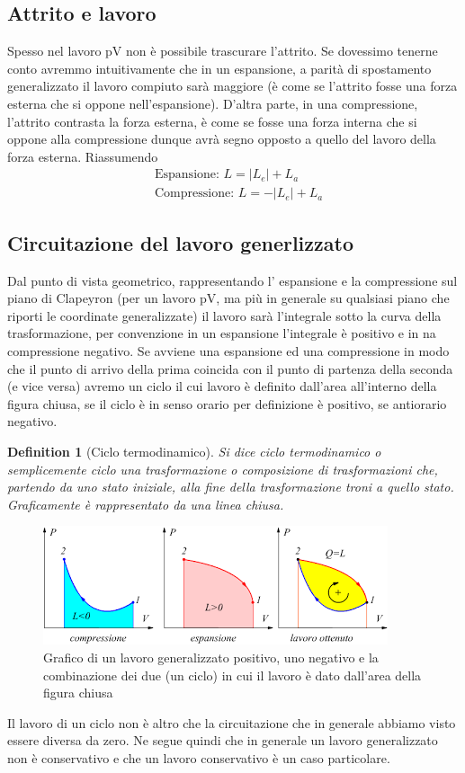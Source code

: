 \documentclass[10pt,a4paper]{article}
\newtheorem{definition}{Definition}
\begin{document}
\subsection{Attrito e lavoro}
Spesso nel lavoro pV non è possibile trascurare l'attrito. Se dovessimo tenerne conto avremmo intuitivamente che in un espansione, a parità di spostamento generalizzato il lavoro compiuto sarà maggiore (è come se l'attrito fosse una forza esterna che si oppone nell'espansione). D'altra parte, in una compressione, l'attrito contrasta la forza esterna, è come se fosse una forza interna che si oppone alla compressione dunque avrà segno opposto a quello del lavoro della forza esterna. Riassumendo
\begin{align*}
	&\text{Espansione: } L = |L_e| + L_a\\
	&\text{Compressione: } L = -|L_e| +L_a
\end{align*}
\subsection{Circuitazione del lavoro generlizzato}
Dal punto di vista geometrico, rappresentando l' espansione e la compressione sul piano di Clapeyron (per un lavoro pV, ma più in generale su qualsiasi piano che riporti le coordinate generalizzate) il lavoro sarà l'integrale sotto la curva della trasformazione, per convenzione in un espansione l'integrale è positivo e in na compressione negativo. Se avviene una espansione ed una compressione in modo che il punto di arrivo della prima coincida con il punto di partenza della seconda (e vice versa) avremo un ciclo il cui lavoro è definito dall'area all'interno della figura chiusa, se il ciclo è in senso orario per definizione è positivo, se antiorario negativo. 
\begin{definition}[Ciclo termodinamico]
	Si dice ciclo termodinamico o semplicemente ciclo una trasformazione o composizione di trasformazioni che, partendo da uno stato iniziale, alla fine della trasformazione troni a quello stato. Graficamente è rappresentato da una linea chiusa. 
\end{definition}
\begin{figure}[h!]
	\centering
	\includegraphics[width=0.5 \linewidth]{../images/ciclo}
	\caption{Grafico di un lavoro generalizzato positivo, uno negativo e la combinazione dei due (un ciclo) in cui il lavoro è dato dall'area della figura chiusa}
	\label{fig:ciclo}
\end{figure}
\FloatBarrier
Il lavoro di un ciclo non è altro che la circuitazione che in generale abbiamo visto essere diversa da zero. Ne segue quindi che in generale un lavoro generalizzato non è conservativo e che un lavoro conservativo è un caso particolare.
\end{document}
